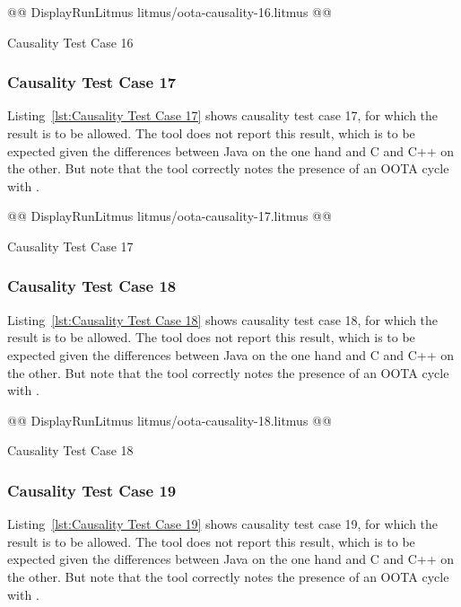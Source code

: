 \documentclass[10]{article}
\begin{document}
\begin{listing}[tbp]
@@ DisplayRunLitmus litmus/oota-causality-16.litmus @@
\caption{Causality Test Case 16}
\label{lst:Causality Test Case 16}
\end{listing}

\subsubsection{Causality Test Case 17}
\label{app:Causality Test Case 17}

Listing~\ref{lst:Causality Test Case 17}
shows causality test case 17, for which the 
result is to be allowed.
The  tool does not report this result, which is to be expected
given the differences between Java on the one hand and C and C++
on the other.
But note that the  tool correctly notes the presence of an
OOTA cycle with .

\begin{listing}[tbp]
@@ DisplayRunLitmus litmus/oota-causality-17.litmus @@
\caption{Causality Test Case 17}
\label{lst:Causality Test Case 17}
\end{listing}

\subsubsection{Causality Test Case 18}
\label{app:Causality Test Case 18}

Listing~\ref{lst:Causality Test Case 18}
shows causality test case 18, for which the 
result is to be allowed.
The  tool does not report this result, which is to be expected
given the differences between Java on the one hand and C and C++
on the other.
But note that the  tool correctly notes the presence of an
OOTA cycle with .

\begin{listing}[tbp]
@@ DisplayRunLitmus litmus/oota-causality-18.litmus @@
\caption{Causality Test Case 18}
\label{lst:Causality Test Case 18}
\end{listing}

\subsubsection{Causality Test Case 19}
\label{app:Causality Test Case 19}

Listing~\ref{lst:Causality Test Case 19}
shows causality test case 19, for which the 
result is to be allowed.
The  tool does not report this result, which is to be expected
given the differences between Java on the one hand and C and C++
on the other.
But note that the  tool correctly notes the presence of an
OOTA cycle with .
\end{document}

